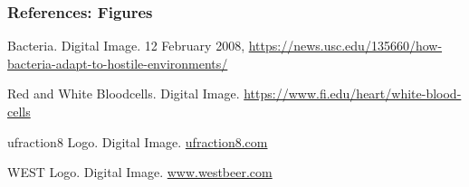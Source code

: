 \documentclass[aspectratio=169,xcolor=dvipsnames]{beamer}
\begin{document}
\begin{frame}
	\frametitle{References: Figures}   
	\begin{thebibliography}{10}    
		
		Bacteria. Digital Image. 12 February 2008, \url{https://news.usc.edu/135660/how-bacteria-adapt-to-hostile-environments/}

		Red and White Bloodcells. Digital Image. \url{https://www.fi.edu/heart/white-blood-cells}

		ufraction8 Logo. Digital Image. 
		\url{ufraction8.com}
		
		WEST Logo. Digital Image.  \url{www.westbeer.com}
	\end{thebibliography}	
\end{frame}
\end{document}
